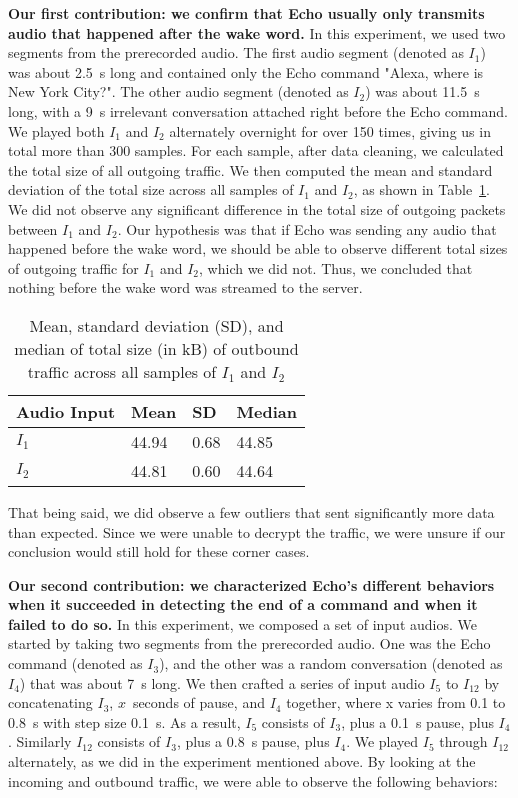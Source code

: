 \textbf{Our first contribution: we confirm that Echo usually only transmits audio that happened after the wake word.} In this experiment, we used two segments from the prerecorded audio. The first audio segment (denoted as $I_1$) was about 2.5~s long and contained only the Echo command "Alexa, where is New York City?". The other audio segment (denoted as $I_2$) was about 11.5~s long, with a 9~s irrelevant conversation attached right before the Echo command. We played both $I_1$ and $I_2$ alternately overnight for over 150 times, giving us in total more than 300 samples. For each sample, after data cleaning, we calculated the total size of all outgoing traffic. We then computed the mean and standard deviation of the total size across all samples of $I_1$ and $I_2$, as shown in Table~\ref{table1}. We did not observe any significant difference in the total size of outgoing packets between $I_1$ and $I_2$. Our hypothesis was that if Echo was sending any audio that happened before the wake word, we should be able to observe different total sizes of outgoing traffic for $I_1$ and $I_2$, which we did not. Thus, we concluded that nothing before the wake word was streamed to the server.

\begin{table}[!b]
\caption{Mean, standard deviation (SD), and median of total size (in kB) of outbound traffic across all samples of $I_1$ and $I_2$}
\begin{tabular}{llll}
\toprule
Audio Input & Mean & SD & Median \\
\midrule
$I_1$ & 44.94 & 0.68 & 44.85\\
$I_2$ & 44.81 & 0.60 & 44.64\\
\bottomrule
\end{tabular}
\label{table1}
\end{table}

That being said, we did observe a few outliers that sent significantly more data than expected. Since we were unable to decrypt the traffic, we were unsure if our conclusion would still hold for these corner cases.

\textbf{Our second contribution: we characterized Echo's different behaviors when it succeeded in detecting the end of a command and when it failed to do so.} In this experiment, we composed a set of input audios. We started by taking two segments from the prerecorded audio. One was the Echo command (denoted as $I_3$), and the other was a random conversation (denoted as $I_4$) that was about 7~s long. We then crafted a series of input audio $I_5$ to $I_{12}$ by concatenating $I_3$, $x$~seconds of pause, and $I_4$ together, where x varies from 0.1 to 0.8~s with step size 0.1~s. As a result, $I_5$ consists of $I_3$, plus a 0.1~s pause, plus $I_4$. Similarly $I_{12}$ consists of $I_3$, plus a 0.8~s pause, plus $I_4$. We played $I_5$ through $I_{12}$ alternately, as we did in the experiment mentioned above. By looking at the incoming and outbound traffic, we were able to observe the following behaviors:

